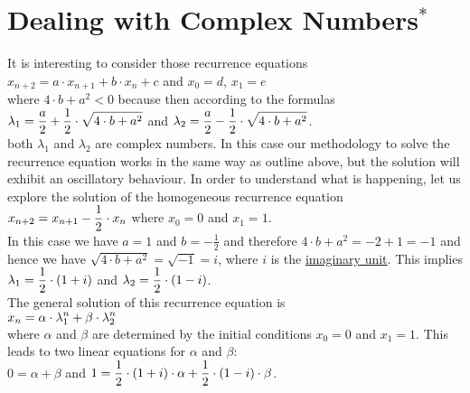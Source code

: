 \section{Dealing with Complex Numbers$^*$}
It is interesting to consider those recurrence equations 
\\[0.2cm]
\hspace*{1.3cm}
$x_{n+2} = a \cdot x_{n+1} + b \cdot x_n + c$ \quad and \quad $x_0 = d$, $x_1 = e$
\\[0.2cm]
where $4 \cdot b + a^2 < 0$ because then according to the formulas
\\[0.2cm]
\hspace*{1.3cm}
$\displaystyle\lambda_1 = \frac{a}{2} + \frac{1}{2} \cdot \sqrt{4 \cdot b + a^2}$ \quad and \quad
$\displaystyle\lambda_2 = \frac{a}{2} - \frac{1}{2} \cdot \sqrt{4 \cdot b + a^2}$.
\\[0.2cm]
both $\lambda_1$ and $\lambda_2$ are complex numbers.  In this case our methodology to solve the
recurrence equation works in the same way as outline above, but the solution will exhibit an oscillatory
behaviour.  In order to understand what is happening, let us explore the solution of the homogeneous recurrence
equation 
\\[0.2cm]
\hspace*{1.3cm}
$\displaystyle x_{n+2} = x_{n+1} - \frac{1}{2} \cdot x_n$ \quad where $x_0 = 0$ and $x_1 = 1$.
\\[0.2cm]
In this case we have $a = 1$ and $b = -\frac{1}{2}$ and therefore $4 \cdot b + a^2 = -2 + 1 = -1$ and hence we
have $\sqrt{4 \cdot b + a^2} = \sqrt{-1} = i$, where $i$ is the
\href{https://en.wikipedia.org/wiki/Imaginary_unit}{imaginary unit}.  
This implies
\\[0.2cm]
\hspace*{1.3cm}
$\displaystyle\lambda_1 = \frac{1}{2} \cdot (1 + i)$ \quad and \quad $\displaystyle\lambda_2 = \frac{1}{2} \cdot (1 - i)$.
\\[0.2cm]
The general solution of this recurrence equation is
\\[0.2cm]
\hspace*{1.3cm}
$\displaystyle x_n = \alpha \cdot \lambda_1^n + \beta \cdot \lambda_2^n$
\\[0.2cm]
where $\alpha$ and $\beta$ are determined by the initial conditions $x_0 = 0$ and $x_1 = 1$.
This leads to two linear equations for $\alpha$ and $\beta$:
\\[0.2cm]
\hspace*{1.3cm}
$0 = \alpha + \beta$ \quad and \quad
$\displaystyle 1 = \frac{1}{2} \cdot (1 + i) \cdot \alpha + \frac{1}{2} \cdot (1 - i) \cdot \beta$.
